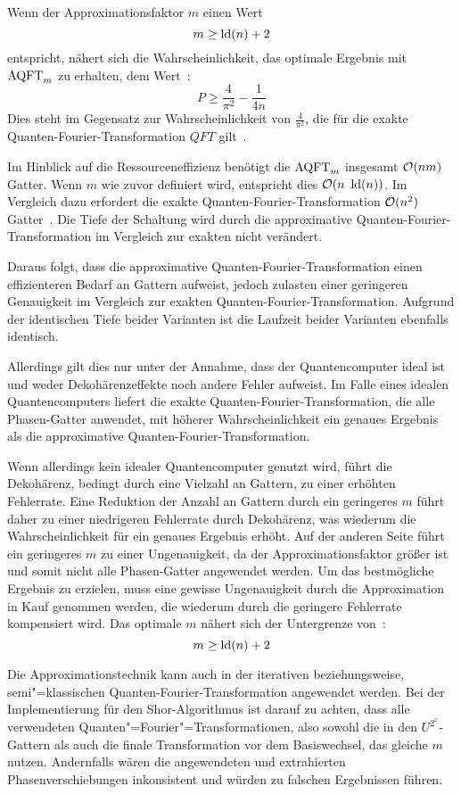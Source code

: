 Wenn der Approximationsfaktor \(m\) einen Wert
\[m \geq \operatorname{ld}(n)+2\]
entspricht, nähert sich die Wahrscheinlichkeit, das optimale Ergebnis mit \(\operatorname{AQFT}_m\)
zu erhalten, dem Wert~\cite{cheung2004improved}: 
\[P \geq \frac{4}{\pi^2} - \frac{1}{4n}\]
Dies steht im Gegensatz zur Wahrscheinlichkeit von \(\frac{4}{\pi^2}\), 
die für die exakte Quanten-Fourier-Transformation \(QFT\) gilt~\cites{cheung2004improved}[119]{kaye2007introduction}.

Im Hinblick auf die Ressourceneffizienz benötigt die \(\operatorname{AQFT}_m\) insgesamt \(\operatorname{\mathcal{O}}(nm)\) Gatter.
Wenn \(m\) wie zuvor definiert wird, entspricht dies \(\operatorname{\mathcal{O}}(n~\operatorname{ld}(n))\). 
Im Vergleich dazu erfordert die exakte Quanten-Fourier-Transformation \(\operatorname{\mathcal{O}}(n^2)\) Gatter~\cite{Barenco_1996}.
Die Tiefe der Schaltung wird durch die approximative Quanten-Fourier-Transformation im Vergleich zur exakten nicht verändert.

Daraus folgt, dass die approximative Quanten-Fourier-Transformation einen effizienteren Bedarf an Gattern aufweist, 
jedoch zulasten einer geringeren Genauigkeit im Vergleich zur exakten Quanten-Fourier-Transformation.
Aufgrund der identischen Tiefe beider Varianten ist die Laufzeit beider Varianten ebenfalls identisch.

Allerdings gilt dies nur unter der Annahme, 
dass der Quantencomputer ideal ist und weder Dekohärenzeffekte noch andere Fehler aufweist.
Im Falle eines idealen Quantencomputers liefert die exakte Quanten-Fourier-Transformation, die alle Phasen-Gatter anwendet, 
mit höherer Wahrscheinlichkeit ein genaues Ergebnis als die approximative Quanten-Fourier-Transformation.

Wenn allerdings kein idealer Quantencomputer genutzt wird, 
führt die Dekohärenz, 
bedingt durch eine Vielzahl an Gattern, 
zu einer erhöhten Fehlerrate.
Eine Reduktion der Anzahl an Gattern durch ein geringeres 
\(m\) führt daher zu einer niedrigeren Fehlerrate durch Dekohärenz, 
was wiederum die Wahrscheinlichkeit für ein genaues Ergebnis erhöht.
Auf der anderen Seite führt ein geringeres \(m\) zu einer Ungenauigkeit,
da der Approximationsfaktor größer ist und somit nicht alle Phasen-Gatter angewendet werden.
Um das bestmögliche Ergebnis zu erzielen, 
muss eine gewisse Ungenauigkeit durch die Approximation in Kauf genommen werden, 
die wiederum durch die geringere Fehlerrate kompensiert wird. 
Das optimale \(m\) nähert sich der Untergrenze von~\cite{Barenco_1996}:
\[m \geq \operatorname{ld}(n)+2\]

Die Approximationstechnik kann auch in der iterativen beziehungsweise, 
semi"=klassisch\-en Quanten-Fourier-Transformation angewendet werden. 
Bei der Implementierung für den Shor-Algorithmus ist darauf zu achten, 
dass alle verwendeten Quanten"=Fourier"=Transformationen, also sowohl die in den \(U^{2^x}\)-Gattern als auch die finale Transformation vor dem Basiswechsel, 
das gleiche \(m\) nutzen.
Andernfalls wären die angewendeten und extrahierten Phasenverschiebungen inkonsistent 
und würden zu falschen Ergebnissen führen.

